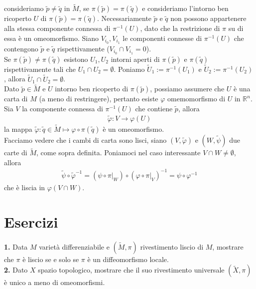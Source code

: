 \documentclass[oneside, 11pt]{amsbook}
\makeatletter
\newcommand{\R}{\mathbb{R}}
\newcommand{\vp}{\varphi}
\newcommand{\gr}[1]{\textbf{#1}}
\newcommand{\wtp}{{\widetilde{p}}}
\newcommand{\wtq}{{\widetilde{q}}}
\newcommand{\wtM}{\widetilde{M}}
\newcommand{\wtU}{{\widetilde U}}
\newcommand{\wtX}{\widetilde{X}}
\newcommand{\wt}[1]{{\widetilde{#1}}}
\newcommand{\0}{{(0)}}
\newcommand{\3}{{(3)}}
\theoremstyle{colonplain}
\theoremstyle{colondefinition}
\theoremstyle{colonremark}
\numberwithin{equation}{chapter}
\renewcommand{\proofname}{Dimostrazione}
\renewenvironment{proof}[1][\proofname]{\par
  \pushQED{\qed}%
  \normalfont \topsep6\p@\@plus6\p@\relax
  \trivlist
  \item[\hskip\labelsep\bfseries #1:]\ignorespaces
}{%
  \popQED\endtrivlist\@endpefalse
}
\makeatother
\begin{document}
\begin{proof}
    consideriamo $\wtp \neq \wtq$ in $\wtM$, se $\pi(\wtp) = \pi(\wtq)$ e consideriamo l'intorno ben ricoperto $U$ di $\pi(\wtp) = \pi(\wtq)$. Necessariamente $\wtp$ e $\wtq$ non possono appartenere alla stessa componente connessa di $\pi^{-1}(U)$, dato che la restrizione di $\pi$ su di essa è un omeomorfismo. Siano $V_{i_0}, V_{i_1}$ le componenti connesse di $\pi^{-1}(U)$ che contengono $\wtp$ e $\wtq$ rispettivamente ($V_{i_0} \cap V_{i_1} = 0$). \\
    Se $\pi(\wtp) \neq \pi(\wtq)$ esistono $U_1, U_2$ intorni aperti di $\pi(\wtp)$ e $\pi(\wtq)$ rispettivamente tali che $U_1 \cap U_2 = \emptyset$. Poniamo $\wtU_1 := \pi^{-1}(U_1)$ e $\wtU_2 := \pi^{-1}(U_2)$, allora $\wtU_1 \cap \wtU_2 = \emptyset$. \\
    Dato $\wtp \in \wtM$ e $U$ intorno ben ricoperto di $\pi(\wtp)$, possiamo assumere che $U$ è una carta di $M$ (a meno di restringere), pertanto esiste $\vp$ omemomorfismo di $U$ in $\R^n$. Sia $V$ la componente connessa di $\pi^{-1}(U)$ che contiene $\wtp$, allora
    \begin{align}
        \wt{\vp} : V \longrightarrow \vp(U)
    \end{align}
    la mappa $\wt{\vp} : \wtq \in \wtM \mapsto \vp \circ \pi (\wtq)$ è un omeomorfismo. \\
    Facciamo vedere che i cambi di carta sono lisci, siano $(V, \wt{\vp})$ e $(W, \wt{\psi})$ due carte di $\wtM$, come sopra definita. Poniamoci nel caso interessante $V \cap W \neq \emptyset$, allora
    \begin{align}
        \wt{\psi} \circ \wt{\vp}^{-1} = (\psi \circ \pi|_W) \circ (\vp \circ \pi|_{V})^{-1} = \psi \circ \vp^{-1} 
    \end{align}
    che è liscia in $\vp(V \cap W)$.
\end{proof}

\section{Esercizi}
\gr{1.} Data $M$ varietà differenziabile e $(\wtM, \pi)$ rivestimento liscio di $M$, mostrare che $\pi$ è liscio se e solo se $\pi$ è un diffeomorfismo locale. \\

\gr{2.} Dato $X$ spazio topologico, mostrare che il suo rivestimento universale $(\wtX,\pi)$ è unico a meno di omeomorfismi.
\end{document}
